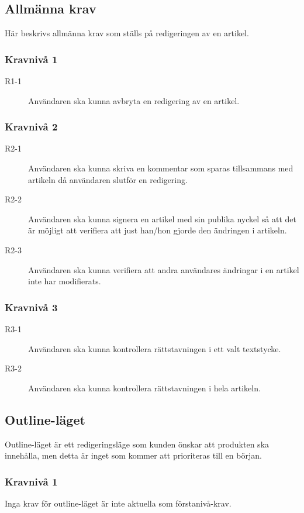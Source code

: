 \subsection{Allmänna krav}
Här beskrivs allmänna krav som ställs på redigeringen av en artikel.

\subsubsection{Kravnivå 1}
\begin{description}
\item[R1-1] Användaren ska kunna avbryta en redigering av en artikel.
\end{description}

\subsubsection{Kravnivå 2}
\begin{description}
\item[R2-1] Användaren ska kunna skriva en kommentar som sparas tillsammans med artikeln då användaren slutför en redigering.
\item[R2-2] Användaren ska kunna signera en artikel med sin publika nyckel så att det är möjligt att verifiera att just han/hon gjorde den ändringen i artikeln.
\item[R2-3] Användaren ska kunna verifiera att andra användares ändringar i en artikel inte har modifierats.
\end{description}

\subsubsection{Kravnivå 3}
\begin{description}
\item[R3-1] Användaren ska kunna kontrollera rättstavningen i ett valt textstycke.
\item[R3-2] Användaren ska kunna kontrollera rättstavningen i hela artikeln.
\end{description}

\subsection{Outline-läget}
Outline-läget är ett redigeringsläge som kunden önskar att produkten ska innehålla, men detta är inget som kommer att prioriteras till en början.

\subsubsection{Kravnivå 1}
Inga krav för outline-läget är inte aktuella som förstanivå-krav.

